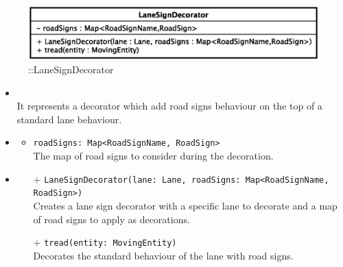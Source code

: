 \begin{figure}[h]
\centering
\includegraphics[scale=0.6,keepaspectratio]{images/solution/app/backend/lane_sign_decorator.eps}
\caption{\pReactiveComponentLaneDecoration::LaneSignDecorator}
\label{fig:sd-app-lane_sign_decorator}
\end{figure}
\FloatBarrier
\begin{itemize}
  \item \textbf{\descr} \\
    It represents a decorator which add road signs behaviour on the top of a standard lane behaviour. 
  \item \textbf{\attrs}
  \begin{itemize}
    \item \texttt{roadSigns: Map<RoadSignName, RoadSign>} \\
The map of road signs to consider during the decoration.
  \end{itemize}
  \item \textbf{\ops}
   \begin{itemize} 
   \item[+] \texttt{LaneSignDecorator(lane: Lane, roadSigns: Map<RoadSignName, RoadSign>)} \\
Creates a lane sign decorator with a specific lane to decorate and a map of road signs to apply as decorations.
    \item[+] \texttt{tread(entity: MovingEntity)} \\
Decorates the standard behaviour of the lane with road signs.  
  \end{itemize}
\end{itemize}
